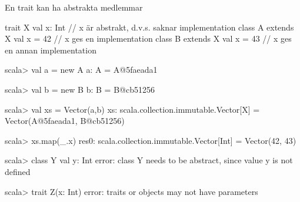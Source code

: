\begin{Slide}{En trait kan ha abstrakta medlemmar}
\begin{Code}
trait X { val x: Int }   // x är abstrakt, d.v.s. saknar implementation
class A extends X { val x = 42 }   // x ges en implementation
class B extends X { val x = 43 }   // x ges en annan implementation
\end{Code}
\pause\vspace{-0.5em}
\begin{REPL}
scala> val a = new A
a: A = A@5faeada1

scala> val b = new B
b: B = B@cb51256

scala> val xs = Vector(a,b)
xs: scala.collection.immutable.Vector[X] = Vector(A@5faeada1, B@cb51256)

scala> xs.map(_.x)
res0: scala.collection.immutable.Vector[Int] = Vector(42, 43)

scala> class Y { val y: Int }
  error: class Y needs to be abstract, since value y is not defined
  
scala> trait Z(x: Int)
  error: traits or objects may not have parameters

\end{REPL}
\end{Slide}


